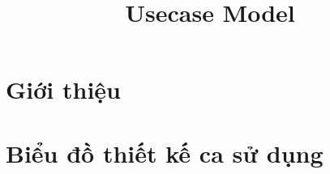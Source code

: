 \documentclass[12pt, a4paper]{article}
\title{Usecase Model}
\begin{document}

\clearpage


\clearpage

\tableofcontents
\clearpage

\section{Giới thiệu}

\clearpage

\section{Biểu đồ thiết kế ca sử dụng}

\clearpage

\clearpage

\clearpage
\glsaddall
\printglossary[title={Giải thích thuật ngữ}]
\end{document}
